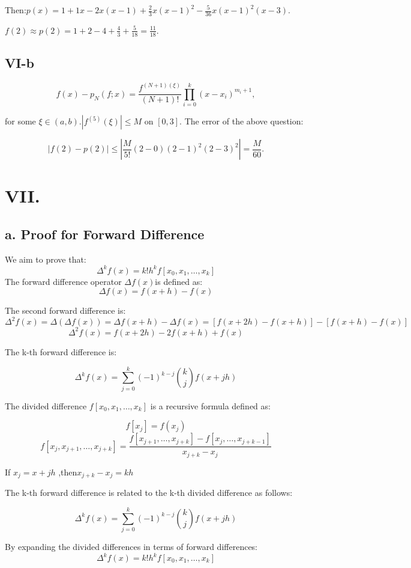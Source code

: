 \documentclass[a4paper]{article}
\begin{document}
Then:$p(x)=1+1x-2x(x-1)+\frac{2}{3}x(x-1)^2-\frac{5}{36}x(x-1)^2(x-3)$.

$f(2) \approx p(2)=1+2-4+\frac{4}{3}+\frac{5}{18}=\frac{11}{18}$.

\subsection*{VI-b}
$$
f(x) - p_N(f; x) = \frac{f^{(N+1)(\xi)}}{(N+1)!} \prod_{i=0}^k(x-x_i)^{m_i + 1},
$$

for some $\xi \in (a,b)$.$|f^{(5)}(\xi)| \le M$ on $[0, 3]$. The error of the above question:

$$
|f(2) - p(2)| \le \left| \frac{M}{5!} (2 - 0)(2 - 1)^2(2-3)^2 \right| = \frac{M}{60}.
$$

\section*{VII. }

\subsection*{a. Proof for Forward Difference}

We aim to prove that:
\[\Delta^k f(x) = k! h^k f[x_0, x_1, \dots, x_k]\]
The forward difference operator  \( \Delta f(x) \)is defined as:
\[\Delta f(x) = f(x + h) - f(x)\]

The second forward difference is:
\[\Delta^2 f(x) = \Delta(\Delta f(x)) = \Delta f(x + h) - \Delta f(x) = [f(x + 2h) - f(x + h)] - [f(x + h) - f(x)]\]
\[\Delta^2 f(x) = f(x + 2h) - 2f(x + h) + f(x)\]

The k-th forward difference is:

\[\Delta^k f(x) = \sum_{j=0}^k (-1)^{k-j} \binom{k}{j} f(x + jh)\]

The divided difference \( f[x_0, x_1, \dots, x_k] \)  is a recursive formula defined as:

\[f[x_j] = f(x_j)\]
\[f[x_j, x_{j+1}, \dots, x_{j+k}] = \frac{f[x_{j+1},\dots, x_{j+k}] - f[x_j, \dots, x_{j+k-1}]}{x_{j+k} - x_j}\]

If \( x_j = x + jh \) ,then\( x_{j+k} - x_j = kh \)

The k-th forward difference is related to the k-th divided difference as follows:

\[\Delta^k f(x) = \sum_{j=0}^k (-1)^{k-j} \binom{k}{j} f(x + jh)\]

By expanding the divided differences in terms of forward differences:
\[\Delta^k f(x) = k! h^k f[x_0, x_1, \dots, x_k]\]
\end{document}
